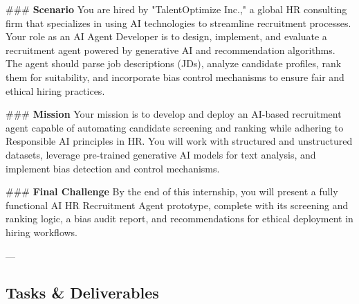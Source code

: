 \documentclass[10pt,a4paper]{article}
\begin{document}
\#\#\# \textbf{Scenario}  
You are hired by "TalentOptimize Inc.," a global HR consulting firm that specializes in using AI technologies to streamline recruitment processes. Your role as an AI Agent Developer is to design, implement, and evaluate a recruitment agent powered by generative AI and recommendation algorithms. The agent should parse job descriptions (JDs), analyze candidate profiles, rank them for suitability, and incorporate bias control mechanisms to ensure fair and ethical hiring practices.  

\#\#\# \textbf{Mission}  
Your mission is to develop and deploy an AI-based recruitment agent capable of automating candidate screening and ranking while adhering to Responsible AI principles in HR. You will work with structured and unstructured datasets, leverage pre-trained generative AI models for text analysis, and implement bias detection and control mechanisms.  

\#\#\# \textbf{Final Challenge}  
By the end of this internship, you will present a fully functional AI HR Recruitment Agent prototype, complete with its screening and ranking logic, a bias audit report, and recommendations for ethical deployment in hiring workflows.  

---

\subsection*{Tasks \& Deliverables}
\end{document}
